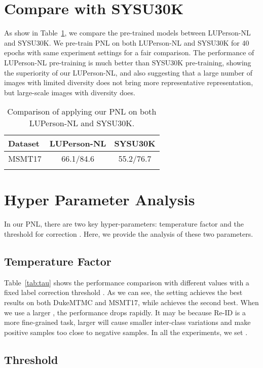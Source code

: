 \documentclass[10pt,twocolumn,letterpaper]{article}
\begin{document}
\section{Compare with SYSU30K}
As show in Table~\ref{tab:lupnl_sysu}, we compare the pre-trained models between LUPerson-NL and SYSU30K. We pre-train PNL on both LUPerson-NL and SYSU30K for 40 epochs with same experiment settings for a fair comparison. The performance of LUPerson-NL pre-training is much better than SYSU30K pre-training, showing the superiority of our LUPerson-NL, and also suggesting that a large number of images with limited diversity does not bring more representative representation, but large-scale images with diversity does.

\begin{table}[t]
	\setlength{\tabcolsep}{5.5mm}
	\centering
	\begin{tabular}{l|c|c}
		\shline
		Dataset & LUPerson-NL & SYSU30K \\
		\hline
		MSMT17 & 66.1/84.6 & 55.2/76.7 \\
		\shline
	\end{tabular}
	\caption{Comparison of applying our PNL on both LUPerson-NL and SYSU30K.}
	\label{tab:lupnl_sysu}
\end{table}



\section{Hyper Parameter Analysis}
In our PNL, there are two key hyper-parameters: temperature factor  and the threshold for correction . Here, we provide the analysis of these two parameters.

\subsection{Temperature Factor }

Table~\ref{tab:tau} shows the performance comparison with different  values with a fixed label correction threshold . As we can see, the setting  achieves the best results on both DukeMTMC and MSMT17, while  achieves the second best. 
When we use a larger , the performance drops rapidly. It may be because Re-ID is a more fine-grained task, larger  will cause smaller inter-class variations and make positive samples too close to negative samples. In all the experiments, we set .



\subsection{Threshold }
\end{document}
